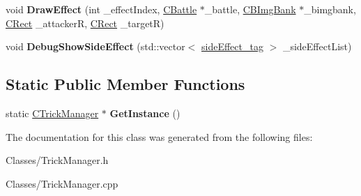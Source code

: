 \begin{DoxyCompactItemize}
\item 
void {\bfseries Draw\+Effect} (int \+\_\+effect\+Index, \hyperlink{class_c_battle}{C\+Battle} $\ast$\+\_\+battle, \hyperlink{class_c_b_img_bank}{C\+B\+Img\+Bank} $\ast$\+\_\+bimgbank, \hyperlink{class_c_rect}{C\+Rect} \+\_\+attackerR, \hyperlink{class_c_rect}{C\+Rect} \+\_\+targetR)\hypertarget{class_c_trick_manager_ae1e882403baed30c569faa88886ad626}{}\label{class_c_trick_manager_ae1e882403baed30c569faa88886ad626}

\item 
void {\bfseries Debug\+Show\+Side\+Effect} (std\+::vector$<$ \hyperlink{structside_effect__tag}{side\+Effect\+\_\+tag} $>$ \+\_\+side\+Effect\+List)\hypertarget{class_c_trick_manager_a8c64cadcba83604210eb7a9c1b2d761d}{}\label{class_c_trick_manager_a8c64cadcba83604210eb7a9c1b2d761d}

\end{DoxyCompactItemize}
\subsection*{Static Public Member Functions}
\begin{DoxyCompactItemize}
\item 
static \hyperlink{class_c_trick_manager}{C\+Trick\+Manager} $\ast$ {\bfseries Get\+Instance} ()\hypertarget{class_c_trick_manager_a0de3b7589935108977cd708b68cc9196}{}\label{class_c_trick_manager_a0de3b7589935108977cd708b68cc9196}

\end{DoxyCompactItemize}


The documentation for this class was generated from the following files\+:\begin{DoxyCompactItemize}
\item 
Classes/Trick\+Manager.\+h\item 
Classes/Trick\+Manager.\+cpp\end{DoxyCompactItemize}
